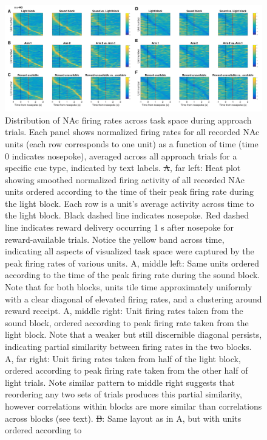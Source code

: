 \documentclass[11pt]{article}
\newcommand{\bsf}[1]{\textbf{#1}}
\providecommand{\DIFadd}[1]{{\protect\color{blue}\uwave{#1}}} %
\providecommand{\DIFdel}[1]{{\protect\color{red}\sout{#1}}}                      %
\providecommand{\DIFaddFL}[1]{\DIFadd{#1}} %
\providecommand{\DIFdelFL}[1]{\DIFdel{#1}} %
\providecommand{\DIFaddbeginFL}{} %
\providecommand{\DIFaddendFL}{} %
\providecommand{\DIFdelbeginFL}{} %
\providecommand{\DIFdelendFL}{} %
\newcommand{\DIFscaledelfig}{0.5}
\newlength{\DIFdelgraphicswidth} %
\newlength{\DIFdelgraphicsheight} %
\newcommand{\DIFaddincludegraphics}[2][]{{\color{blue}\fbox{\DIFOincludegraphics[#1]{#2}}}} %
\newcommand{\DIFdelincludegraphics}[2][]{%
\sbox{\DIFdelgraphicsbox}{\DIFOincludegraphics[#1]{#2}}%
\settoboxwidth{\DIFdelgraphicswidth}{\DIFdelgraphicsbox} %
\settoboxtotalheight{\DIFdelgraphicsheight}{\DIFdelgraphicsbox} %
\scalebox{\DIFscaledelfig}{%
\parbox[b]{\DIFdelgraphicswidth}{\usebox{\DIFdelgraphicsbox}\\[-\baselineskip] \rule{\DIFdelgraphicswidth}{0em}}\llap{\resizebox{\DIFdelgraphicswidth}{\DIFdelgraphicsheight}{%
\setlength{\unitlength}{\DIFdelgraphicswidth}%
\begin{picture}(1,1)%
\thicklines\linethickness{2pt} %
{\color[rgb]{1,0,0}\put(0,0){\framebox(1,1){}}}%
{\color[rgb]{1,0,0}\put(0,0){\line( 1,1){1}}}%
{\color[rgb]{1,0,0}\put(0,1){\line(1,-1){1}}}%
\end{picture}%
}\hspace*{3pt}}} %
} %
\DeclareRobustCommand{\DIFaddbeginFL}{\DIFOaddbeginFL \let\includegraphics\DIFaddincludegraphics} %
\DeclareRobustCommand{\DIFaddendFL}{\DIFOaddendFL \let\includegraphics\DIFOincludegraphics} %
\DeclareRobustCommand{\DIFdelbeginFL}{\DIFOdelbeginFL \let\includegraphics\DIFdelincludegraphics} %
\DeclareRobustCommand{\DIFdelendFL}{\DIFOaddendFL \let\includegraphics\DIFOincludegraphics} %
\begin{document}
{\begin{figure}
[h]
\centering
\includegraphics[height=0.5\textheight]{Fig 12 - NP task tiling.png}
\caption{Distribution of NAc firing rates across task space during approach
  trials. Each panel shows normalized firing rates for all recorded NAc units
  (each row corresponds to one unit) as a function of time (time 0 indicates
  nosepoke), averaged across all approach trials for a specific cue type,
  indicated by text labels. \DIFdelbeginFL \DIFdelFL{A}\DIFdelendFL \DIFaddbeginFL \DIFaddFL{\bsf{A}}\DIFaddendFL , far left: Heat plot showing smoothed
  normalized firing activity of all recorded NAc units ordered according to the
  time of their peak firing rate during the light block. Each row is a unit’s
  average activity across time to the light block. Black dashed line indicates
  nosepoke. Red dashed line indicates reward delivery occurring 1 s after
  nosepoke for reward-available trials. Notice the yellow band across time,
  indicating all aspects of visualized task space were captured by the peak
  firing rates of various units. A, middle left: Same units ordered according to
  the time of the peak firing rate during the sound block. Note that for both
  blocks, units tile time approximately uniformly with a clear diagonal of
  elevated firing rates, and a clustering around reward receipt. A, middle
  right: Unit firing rates taken from the sound block, ordered according to peak
  firing rate taken from the light block. Note that a weaker but still
  discernible diagonal persists, indicating partial similarity between firing
  rates in the two blocks. A, far right: Unit firing rates taken from half of
  the light block, ordered according to peak firing rate taken from the other
  half of light trials. Note similar pattern to middle right suggests that
  reordering any two sets of trials produces this partial similarity, however
  correlations within blocks are more similar than correlations across blocks
  (see text). \DIFdelbeginFL \DIFdelFL{B}\DIFdelendFL \DIFaddbeginFL \DIFaddFL{\bsf{B}}\DIFaddendFL : Same layout as in A, but with units ordered according to
}
\end{figure}}
\end{document}
